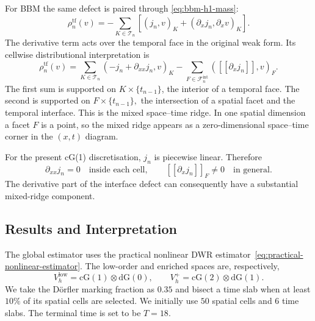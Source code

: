 For BBM the same defect is paired through \eqref{eq:bbm-h1-mass}:
\begin{equation}
  \rho_n^{\mathrm{tf}}(v)
  =-\sum_{K\in\mathcal T_n}
   \left[(j_n,v)_K+(\partial_xj_n,\partial_xv)_K\right].
  \label{eq:bbm-temporal-residual}
\end{equation}
The derivative term acts over the temporal face in the original weak form. Its cellwise distributional interpretation is
\begin{equation}
  \rho_n^{\mathrm{tf}}(v)
  =\sum_{K\in\mathcal T_n}(-j_n+\partial_{xx}j_n,v)_K
   -\sum_{F\in\mathcal F_n^{\mathrm{int}}}
    ([\![\partial_xj_n]\!],v)_F.
  \label{eq:bbm-temporal-ibp}
\end{equation}
The first sum is supported on $K\times\{t_{n-1}\}$, the interior of a temporal face. The second is supported on \( F\times\{t_{n-1}\},\)
the intersection of a spatial facet and the temporal interface. This is the mixed space--time ridge. In one spatial dimension a facet $F$ is a point, so the mixed ridge appears as a zero-dimensional space--time corner in the $(x,t)$ diagram.

For the present cG(1) discretisation, $j_n$ is piecewise linear. Therefore
\begin{equation*}
  \partial_{xx}j_n=0\quad\text{inside each cell},
  \qquad
  [\![\partial_xj_n]\!]_F\ne0\quad\text{in general}.
  \label{eq:bbm-cg1-ridge}
\end{equation*}
The derivative part of the interface defect can consequently have a substantial mixed-ridge component.



\subsection{Results and Interpretation}

The global estimator uses the practical nonlinear DWR estimator~\eqref{eq:practical-nonlinear-estimator}. The low-order and enriched spaces are, respectively,
\begin{equation*}
  V_h^{\mathrm{low}}=\mathrm{cG}(1)\otimes\mathrm{dG}(0),
  \qquad
  V_h^+=\mathrm{cG}(2)\otimes\mathrm{dG}(1).
\end{equation*}
We take the D\"orfler marking fraction as $0.35$ and bisect a time slab when at least $10\%$ of its spatial cells are selected. We initially use $50$ spatial cells and $6$ time slabs. The terminal time is set to be $T = 18$.

